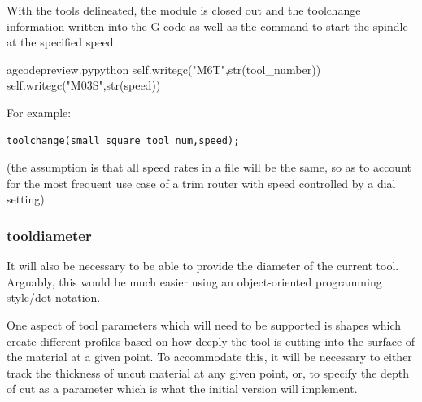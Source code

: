 \documentclass{ltxdoc}
\begin{document}
\addtocounter{gcpy}{65}
 
\noindent With the tools delineated, the module is closed out and the toolchange information written into the G-code as well as the command to start the spindle at the specified speed.
 
\lstset{firstnumber=\thegcpy}
\begin{writecode}{a}{gcodepreview.py}{python}
        self.writegc("M6T",str(tool_number))
        self.writegc("M03S",str(speed))

\end{writecode}
\addtocounter{gcpy}{3}

For example:

\begin{verbatim}
toolchange(small_square_tool_num,speed);
\end{verbatim}

\noindent (the assumption is that all speed rates in a file will be the same, so as to account for the most frequent use case of a trim router with speed controlled by a dial setting)

\subsubsection{tooldiameter}

It will also be necessary to be able to provide the diameter of the current tool. Arguably, this would be much easier using an object-oriented programming style/dot notation.

One aspect of tool parameters which will need to be supported is shapes which create different profiles based on how deeply the tool is cutting into the surface of the material at a given point. To accommodate this, it will be necessary to either track the thickness of uncut material at any given point, or, to specify the depth of cut as a parameter which is what the initial version will implement.
\end{document}
